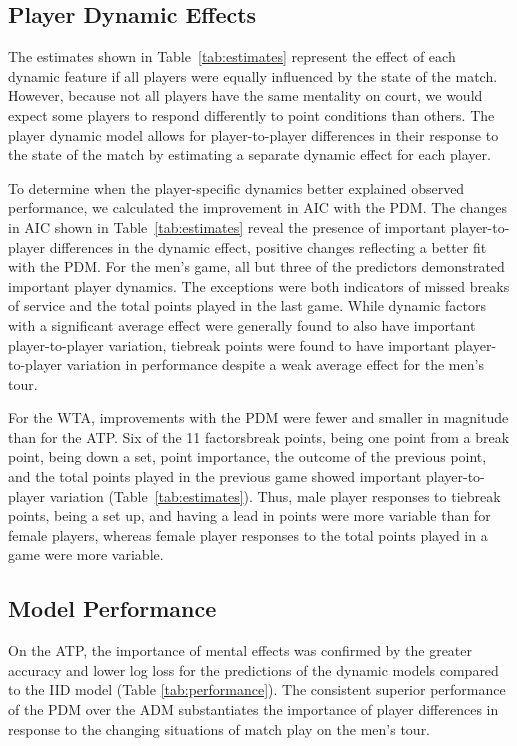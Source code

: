 \documentclass{Latex/svjour3}
\begin{document}
\subsection{Player Dynamic Effects}

The estimates shown in Table~\ref{tab:estimates} represent the effect of each
dynamic feature if all players were equally influenced by the state of the
match. However, because not all players have the same mentality on court, we
would expect some players to respond differently to point conditions than
others. The player dynamic model allows for player-to-player differences in
their response to the state of the match by estimating a separate dynamic effect
for each player.

To determine when the player-specific dynamics better explained observed
performance, we calculated the improvement in AIC with the PDM. The changes in
AIC shown in Table~\ref{tab:estimates} reveal the presence of important
player-to-player differences in the dynamic effect, positive changes reflecting
a better fit with the PDM. For the men's game, all but three of the predictors
demonstrated important player dynamics. The exceptions were both indicators of
missed breaks of service and the total points played in the last game. While
dynamic factors with a significant average effect were generally found to also
have important player-to-player variation, tiebreak points were found to have
important player-to-player variation in performance despite a weak average
effect for the men's tour.

For the WTA, improvements with the PDM were fewer and smaller in magnitude than
for the ATP. Six of the 11 factors\textemdash break points, being one point from
a break point, being down a set, point importance, the outcome of the previous
point, and the total points played in the previous game \textemdash showed
important player-to-player variation (Table~\ref{tab:estimates}). Thus, male
player responses to tiebreak points, being a set up, and having a lead in points
were more variable than for female players, whereas female player responses to
the total points played in a game were more variable.

\subsection{Model Performance}

On the ATP, the importance of mental effects was confirmed by the greater
accuracy and lower log loss for the predictions of the dynamic models compared
to the IID model (Table \ref{tab:performance}). The consistent superior
performance of the PDM over the ADM substantiates the importance of player
differences in response to the changing situations of match play on the men's
tour.
\end{document}
